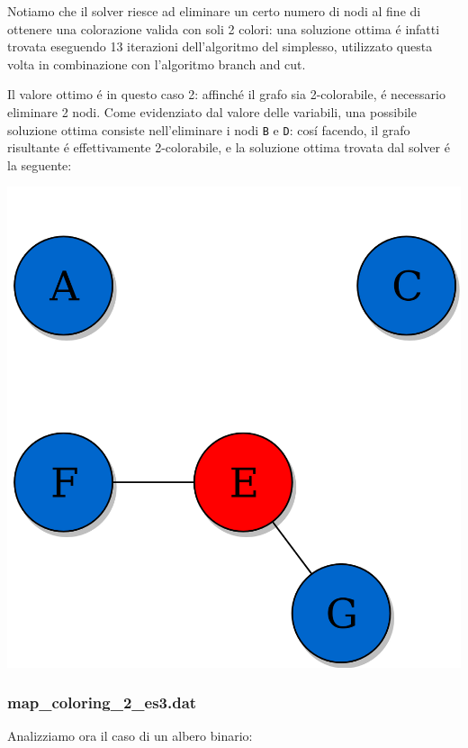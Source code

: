 \documentclass{article}
\begin{document}
Notiamo che il solver riesce ad eliminare un certo numero di nodi al fine di ottenere una colorazione valida con soli 2 colori: una soluzione ottima \'e infatti trovata eseguendo 13 iterazioni dell'algoritmo del simplesso, utilizzato questa volta in combinazione con l'algoritmo branch and cut.\\

\pagebreak

Il valore ottimo \'e in questo caso 2: affinch\'e il grafo sia 2-colorabile, \'e necessario eliminare 2 nodi. Come evidenziato dal valore delle variabili, una possibile soluzione ottima consiste nell'eliminare i nodi \texttt{B} e \texttt{D}: cos\'i facendo, il grafo risultante \'e effettivamente 2-colorabile, e la soluzione ottima trovata dal solver \'e la seguente:\\

\begin{center}
\includegraphics[scale=0.15]{non_complete_graph_coloured2.png}
\end{center}

\pagebreak

\subsubsection{map\_coloring\_2\_es3.dat}
Analizziamo ora il caso di un albero binario:\\
\end{document}
